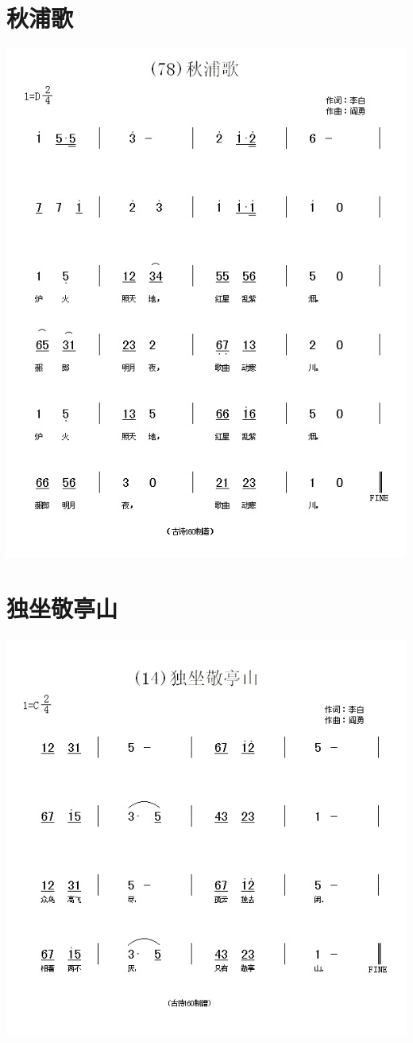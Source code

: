\documentclass[cn,pad,twocol]{elegantbook}
\begin{document}
\section{秋浦歌}    \includegraphics[width=\textwidth]{dongxiao/20200808-秋浦歌-李白.jpg}
\section{独坐敬亭山}\includegraphics[width=\textwidth]{dongxiao/20200808-独坐敬亭山-李白.jpg}
\end{document}
